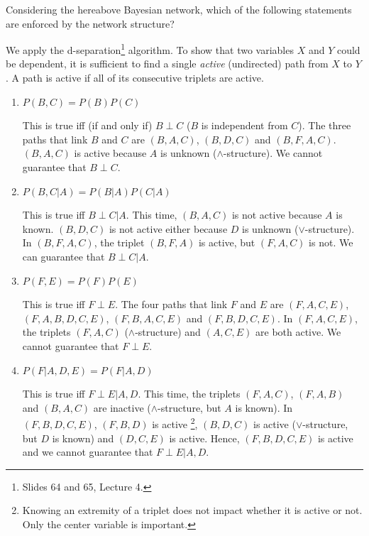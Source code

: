 \documentclass[11pt, a4paper]{article}
\begin{document}
Considering the hereabove Bayesian network, which of the following statements are enforced by the network structure?

\begin{solution}
    We apply the d-separation\footnote{Slides 64 and 65, Lecture 4.} algorithm. To show that two variables $X$ and $Y$ could be dependent, it is sufficient to find a single \emph{active} (undirected) path from $X$ to $Y$. A path is active if all of its consecutive triplets are active.
\end{solution}

\begin{enumerate}
    \item $P(B, C) = P(B) P(C)$

    \begin{solution}
        This is true iff (if and only if) $B \perp C$ ($B$ is independent from $C$). The three paths that link $B$ and $C$ are $(B, A, C)$, $(B, D, C)$ and $(B, F, A, C)$. $(B, A, C)$ is active because $A$ is unknown ($\wedge$-structure). We cannot guarantee that $B \perp C$.
    \end{solution}

    \item $P(B, C | A) = P(B | A) P(C | A)$

    \begin{solution}
        This is true iff $B \perp C | A$. This time, $(B, A, C)$ is not active because $A$ is known. $(B, D, C)$ is not active either because $D$ is unknown ($\vee$-structure). In $(B, F, A, C)$, the triplet $(B, F, A)$ is active, but $(F, A, C)$ is not. We can guarantee that $B \perp C | A$.
    \end{solution}

    \item $P(F, E) = P(F) P(E)$

    \begin{solution}
        This is true iff $F \perp E$. The four paths that link $F$ and $E$ are $(F, A, C, E)$, $(F, A, B, D, C, E)$, $(F, B, A, C, E)$ and $(F, B, D, C, E)$. In $(F, A, C, E)$, the triplets $(F, A, C)$ ($\wedge$-structure) and $(A, C, E)$ are both active. We cannot guarantee that $F \perp E$.
    \end{solution}

    \item $P(F | A, D, E) = P(F | A, D)$

    \begin{solution}
        This is true iff $F \perp E | A, D$. This time, the triplets $(F, A, C)$, $(F, A, B)$ and $(B, A, C)$ are inactive ($\wedge$-structure, but $A$ is known). In $(F, B, D, C, E)$, $(F, B, D)$ is active \footnote{Knowing an extremity of a triplet does not impact whether it is active or not. Only the center variable is important.}, $(B, D, C)$ is active ($\vee$-structure, but $D$ is known) and $(D, C, E)$ is active. Hence, $(F, B, D, C, E)$ is active and we cannot guarantee that $F \perp E | A, D$.
    \end{solution}


\end{enumerate}
\end{document}
